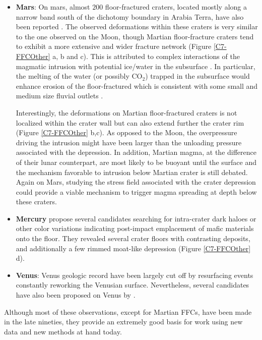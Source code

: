 \begin{itemize}
\item \textbf{Mars}:  On mars,  almost $200$  floor-fractured craters,
  located mostly along  a narrow band south of  the dichotomy boundary
  in Arabia Terra, have also been reported \citep{Bamberg:2014hb}. The
  observed deformations  within these craters  is very similar  to the
  one observed on the Moon, though Martian floor-fracture craters tend
  to  exhibit a  more  extensive and  wider  fracture network  (Figure
  \ref{C7-FFCOther}  a,  b  and  c). This  is  attributed  to  complex
  interactions of  the magmatic intrusion with  potential ice/water in
  the  subsurface  \citep{Sato:2010ex,Bamberg:2014hb}. In  particular,
  the  melting  of the  water  (or  possibly  CO$_2$) trapped  in  the
  subsurface  would enhance  erosion of  the floor-fractured  which is
  consistent  with   some  small  and  medium   size  fluvial  outlets
  \citep{Sato:2010ex}.

  Interestingly, the  deformations on Martian  floor-fractured craters
  is not localized within the crater  wall but can also extend further
  the crater  rim (Figure \ref{C7-FFCOther}  b,c).  As opposed  to the
  Moon, the overpressure driving the  intrusion might have been larger
  than  the  unloading pressure  associated  with  the depression.  In
  addition,  Martian   magma,  at   the  difference  of   their  lunar
  counterpart, are most likely to be buoyant until the surface and the
  mechanism  favorable  to intrusion  below  Martian  crater is  still
  debated. Again  on Mars, studying  the stress field  associated with
  the crater  depression could provide  a viable mechanism  to trigger
  magma spreading at depth below these craters.

\item   \textbf{Mercury}    \citet{Schultz:1977ec}   propose   several
  candidates  searching for  intra-crater dark  haloes or  other color
  variations  indicating post-impact  emplacement  of mafic  materials
  onto the floor. They revealed several crater floors with contrasting
  deposits, and additionally a few rimmed moat-like depression (Figure
  \ref{C7-FFCOther} d).

\item \textbf{Venus}: Venus geologic record  have been largely cut off
  by  resurfacing events  constantly reworking  the Venusian  surface.
  Nevertheless, several candidates have also been proposed on Venus by
  \citet{Wichman:1995ju}.
\end{itemize}

Although most  of these  observations, except  for Martian  FFCs, have
been made in  the late nineties, they provide an  extremely good basis
for work using new data and new methods at hand today.

